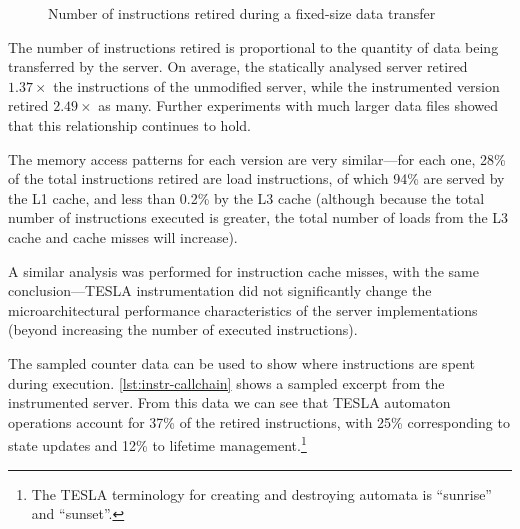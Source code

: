 \begin{figure}[ht]
  \centering
  \caption{Number of instructions retired during a fixed-size data
  transfer}
  \label{fig:retired-bench}
\end{figure}

The number of instructions retired is proportional to the quantity of data being
transferred by the server. On average, the statically analysed server retired
$1.37\times$ the instructions of the unmodified server, while the instrumented
version retired $2.49\times$ as many. Further experiments with much larger data
files showed that this relationship continues to hold.

The memory access patterns for each version are very similar---for each
one, 28\% of the total instructions retired are load instructions, of
which 94\% are served by the L1 cache, and less than 0.2\% by the L3
cache (although because the total number of instructions executed is
greater, the total number of loads from the L3 cache and cache misses
will increase).

A similar analysis was performed for instruction cache misses, with the
same conclusion---TESLA instrumentation did not significantly change the
microarchitectural performance characteristics of the server
implementations (beyond increasing the number of executed instructions).

The sampled counter data can be used to show where instructions are
spent during execution. \autoref{lst:instr-callchain} shows a sampled
excerpt from the instrumented server. From this data we can see that
TESLA automaton operations account for 37\% of the retired instructions,
with 25\% corresponding to state updates and 12\% to lifetime
management.\footnote{The TESLA terminology for creating and destroying
automata is ``sunrise'' and ``sunset''.}

